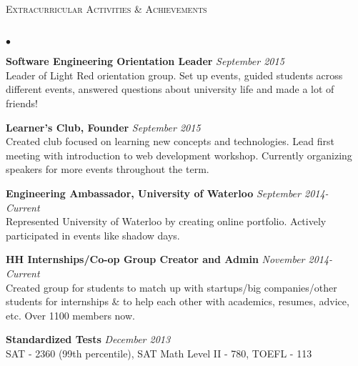 \documentclass[10pt]{article}
\newcommand{\lineunder}{\vspace*{-8pt} \\ \hspace*{-18pt} \hrulefill \\}
\newcommand{\header}[1]{{\hspace*{-15pt}\vspace*{6pt} \textsc{#1}} \vspace*{-6pt} \lineunder}
\newenvironment{achievements}{\begin{list}{$\bullet$}{\topsep 0pt \itemsep -1.5pt \leftmargin 5pt}}{\vspace*{4pt}\end{list}}
\begin{document}
\header{\normalsize Extracurricular Activities \& Achievements}
\begin{achievements}
\item \textbf{Software Engineering Orientation Leader} \hfill \textit {September 2015}
\\ Leader of Light Red orientation group. Set up events, guided students across different events, answered questions about university life and made a lot of friends!
\item \textbf{Learner's Club, Founder} \hfill \textit {September 2015}
\\ Created club focused on learning new concepts and technologies. Lead first meeting with introduction to web development workshop. Currently organizing speakers for more events throughout the term.
\item \textbf{Engineering Ambassador, University of Waterloo} \hfill \textit {September 2014- Current}
\\ Represented University of Waterloo by creating online portfolio. Actively participated in events like shadow days.
\item \textbf{HH Internships/Co-op Group Creator and Admin} \hfill \textit {November 2014- Current}
\\ Created group for students to match up with startups/big companies/other students for internships \& to help each other with academics, resumes, advice, etc. Over 1100 members now.
\item \textbf{Standardized Tests} \hfill \textit {December 2013}
\\ SAT - 2360 (99th percentile), SAT Math Level II - 780, TOEFL - 113
\end{achievements}
\end{document}
